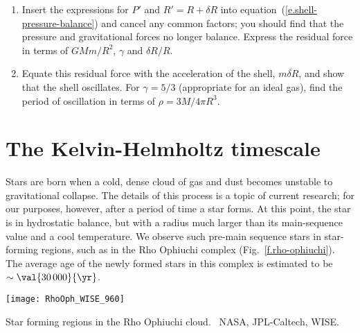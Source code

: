 \begin{exercisebox}
\begin{enumerate}
\item
Insert the expressions for $P'$ and $R'=R+\delta R$ into equation~(\ref{e.shell-pressure-balance}) and cancel any common factors; you should find that the pressure and gravitational forces no longer balance. Express the residual force in terms of $GMm/R^{2}$, $\gamma$ and $\delta R/R$.

\item
Equate this residual force with the acceleration of the shell, $m\ddot{\delta R}$, and show that the shell oscillates. For $\gamma = 5/3$ (appropriate for an ideal gas), find the period of oscillation in terms of $\rho = 3M/4\pi R^{3}$.
\end{enumerate}
\end{exercisebox}

\section{The Kelvin-Helmholtz timescale}
\label{s.stellar-contraction}

Stars are born when a cold, dense cloud of gas and dust becomes unstable to gravitational collapse. The details of this process is a topic of current research; for our purposes, however, after a period of time a  star forms. At this point, the star is in hydrostatic balance, but with a radius much larger than its main-sequence value and a cool  temperature. We observe such pre-main sequence stars in star-forming regions, such as in the Rho Ophiuchi complex (Fig.~\ref{f.rho-ophiuchi}). The average age of the newly formed stars in this complex is estimated to be $\sim \val{30\,000}{\yr}$.
\begin{marginfigure}
\texttt{[image: RhoOph\_WISE\_960]}
\caption[Stars forming in Rho Ophiuchi]{\label{f.rho-ophiuchi} Star forming regions in the Rho Ophiuchi cloud. \imgcred\ NASA, JPL-Caltech, WISE.}
\end{marginfigure}

